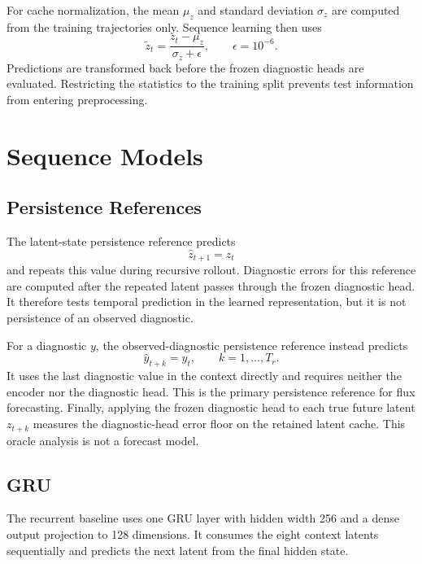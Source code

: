 For cache normalization, the mean $\mu_z$ and standard deviation $\sigma_z$ are computed from the
training trajectories only. Sequence learning then uses
\begin{equation}
  \tilde z_t = \frac{z_t-\mu_z}{\sigma_z+\epsilon},\qquad \epsilon=10^{-6}.
\end{equation}
Predictions are transformed back before the frozen diagnostic heads are evaluated. Restricting the
statistics to the training split prevents test information from entering preprocessing.

\section{Sequence Models}

\subsection{Persistence References}

The latent-state persistence reference predicts
\begin{equation}
  \hat z_{t+1}=z_t
\end{equation}
and repeats this value during recursive rollout. Diagnostic errors for this reference are computed
after the repeated latent passes through the frozen diagnostic head. It therefore tests temporal
prediction in the learned representation, but it is not persistence of an observed diagnostic.

For a diagnostic $y$, the observed-diagnostic persistence reference instead predicts
\begin{equation}
  \hat y_{t+k}=y_t,\qquad k=1,\ldots,T_r.
\end{equation}
It uses the last diagnostic value in the context directly and requires neither the encoder nor the
diagnostic head. This is the primary persistence reference for flux forecasting. Finally, applying
the frozen diagnostic head to each true future latent $z_{t+k}$ measures the diagnostic-head error
floor on the retained latent cache. This oracle analysis is not a forecast model.

\subsection{GRU}

The recurrent baseline uses one GRU layer with hidden width 256 and a dense output projection to
128 dimensions. It consumes the eight context latents sequentially and predicts the next latent
from the final hidden state.

